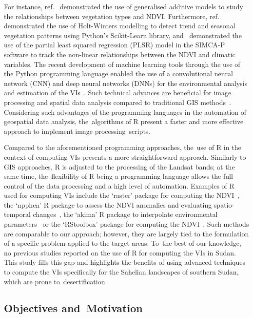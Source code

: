 \documentclass[jimaging,article,accept,pdftex,moreauthors]{Definitions/mdpi}
\begin{document}
For instance, ref.~\cite{MARTINEZ2023115155} demonstrated the use of generalised additive models to study the relationships between vegetation types and NDVI. Furthermore, ref.~\cite{OMAR2021e01020} demonstrated the use of Holt-Winters modelling to detect trend and seasonal vegetation patterns using Python's Scikit-Learn library, and~\cite{WANG2022102704} demonstrated the use of the partial least squared regression (PLSR) model in the SIMCA-P software to track the non-linear relationships between the NDVI and climatic variables. The recent development of machine learning tools through the use of the Python programming language enabled the use of a convolutional neural network (CNN) and deep neural networks (DNNs) for the environmental analysis and estimation of the VIs~\cite{BARRIGUINHA2022103069,ROY2021100582,LI2022102818,DAVIDSON2022107396}. Such technical advances are beneficial for image processing and spatial data analysis compared to traditional GIS methods~\cite{6049966,Lemenkova202301,6910592,Lemenkova202228,9323708,1027236}. Considering such advantages of the programming languages in the automation of geospatial data analysis, the~algorithms of R present a faster and more effective approach to implement image processing~scripts.

Compared to the aforementioned programming approaches, the~use of R in the context of computing VIs presents a more straightforward approach. Similarly to GIS approaches, R is adjusted to the processing of the Landsat bands; at the same time, the~flexibility of R being a programming language allows the full control of the data processing and a high level of automation. Examples of R used for computing VIs include the `raster' package for computing the NDVI~\cite{LEVEAU2021127199}, the `npphen' R package to assess the NDVI anomalies and evaluating spatio-temporal changes~\cite{CHAVEZ2023103138}, the `akima' R package to interpolate environmental parameters~\cite{KLIMAVICIUS2023171} or the `RStoolbox' package for computing the NDVI~\cite{PRAVALIE2022108629}. Such methods are comparable to our approach; however, they are largely tied to the formulation of a specific problem applied to the target areas. To~the best of our knowledge, no previous studies reported on the use of R for computing the VIs in Sudan. This study fills this gap and highlights the benefits of using advanced techniques to compute the VIs specifically for the Sahelian landscapes of southern Sudan, which are prone to~desertification.

\subsection{Objectives and~Motivation}
\end{document}
